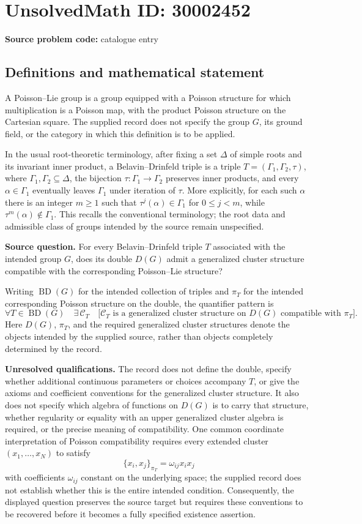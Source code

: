 \documentclass[11pt]{article}
\begin{document}
\section*{UnsolvedMath ID: 30002452}
\textbf{Source problem code:} catalogue entry
\subsection{Definitions and mathematical statement}
A Poisson--Lie group is a group equipped with a Poisson structure for which multiplication is a Poisson map, with the product Poisson structure on the Cartesian square. The supplied record does not specify the group \(G\), its ground field, or the category in which this definition is to be applied.

In the usual root-theoretic terminology, after fixing a set \(\Delta\) of simple roots and its invariant inner product, a Belavin--Drinfeld triple is a triple \(T=(\Gamma_1,\Gamma_2,\tau)\), where \(\Gamma_1,\Gamma_2\subseteq\Delta\), the bijection \(\tau:\Gamma_1\to\Gamma_2\) preserves inner products, and every \(\alpha\in\Gamma_1\) eventually leaves \(\Gamma_1\) under iteration of \(\tau\). More explicitly, for each such \(\alpha\) there is an integer \(m\geq1\) such that \(\tau^j(\alpha)\in\Gamma_1\) for \(0\leq j<m\), while \(\tau^m(\alpha)\notin\Gamma_1\). This recalls the conventional terminology; the root data and admissible class of groups intended by the source remain unspecified.

\textbf{Source question.} For every Belavin--Drinfeld triple \(T\) associated with the intended group \(G\), does its double \(D(G)\) admit a generalized cluster structure compatible with the corresponding Poisson--Lie structure?

Writing \(\operatorname{BD}(G)\) for the intended collection of triples and \(\pi_T\) for the intended corresponding Poisson structure on the double, the quantifier pattern is
\[
\forall T\in\operatorname{BD}(G)\quad
\exists\,\mathcal C_T\quad
\bigl[\mathcal C_T\text{ is a generalized cluster structure on }D(G)
\text{ compatible with }\pi_T\bigr].
\]
Here \(D(G)\), \(\pi_T\), and the required generalized cluster structures denote the objects intended by the supplied source, rather than objects completely determined by the record.

\textbf{Unresolved qualifications.} The record does not define the double, specify whether additional continuous parameters or choices accompany \(T\), or give the axioms and coefficient conventions for the generalized cluster structure. It also does not specify which algebra of functions on \(D(G)\) is to carry that structure, whether regularity or equality with an upper generalized cluster algebra is required, or the precise meaning of compatibility. One common coordinate interpretation of Poisson compatibility requires every extended cluster \((x_1,\ldots,x_N)\) to satisfy
\[
\{x_i,x_j\}_{\pi_T}=\omega_{ij}x_ix_j
\]
with coefficients \(\omega_{ij}\) constant on the underlying space; the supplied record does not establish whether this is the entire intended condition. Consequently, the displayed question preserves the source target but requires these conventions to be recovered before it becomes a fully specified existence assertion.
\end{document}
